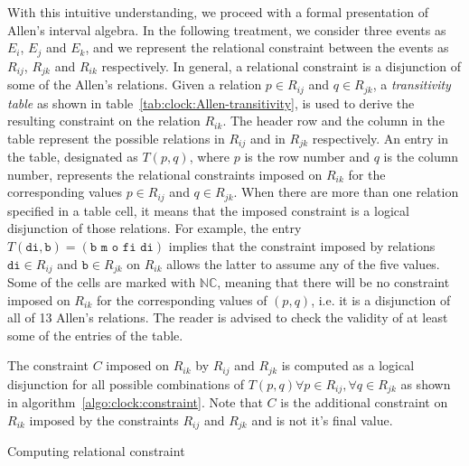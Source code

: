 With this intuitive understanding, we proceed with a formal presentation of Allen's interval algebra. In the following treatment, we 
consider three events as $E_i$, $E_j$ and $E_k$, and we represent the relational constraint between the events as $R_{ij}$, $R_{jk}$ 
and $R_{ik}$ respectively. In general, a relational constraint is a disjunction of some of the Allen's relations. 
%
Given a relation $p \in R_{ij}$ and $q \in R_{jk}$, a {\em transitivity table} as shown in table~\ref{tab:clock:Allen-transitivity}, 
is used to derive the resulting constraint on the relation $R_{ik}$. The header row and the column in the table 
represent the possible relations in $R_{ij}$ and in $R_{jk}$ respectively. An entry in the table, designated as $T(p,q)$, where $p$ 
is the row number and $q$ is the column number, represents the relational constraints imposed on $R_{ik}$ for the corresponding values 
$p \in R_{ij}$ and $q \in R_{jk}$. When there are more than one relation specified in a table cell, it means that the imposed constraint
is a logical disjunction of those relations. For example, the entry $T(\texttt{di},\texttt{b}) = (\texttt{b m o fi di})$ implies that 
the constraint imposed
by relations $\texttt{di} \in R_{ij}$ and $\texttt{b} \in R_{jk}$ on $R_{ik}$ allows the latter to assume any of the five values. Some 
of the cells are marked with $\mathbb{NC}$, meaning that there will be no constraint imposed on $R_{ik}$ for the corresponding values 
of $(p,q)$, i.e. it is a disjunction of all of 13 Allen's relations. The reader is advised to check the validity of at least some of the 
entries of the table.
 
The constraint $C$ imposed on $R_{ik}$ by $R_{ij}$ and $R_{jk}$ is computed as a logical disjunction for all possible combinations of 
$T(p,q) \forall p \in R_{ij}, \forall q \in R_{jk}$ as shown in algorithm~\ref{algo:clock:constraint}. Note that $C$ is the additional 
constraint on $R_{ik}$ imposed by the constraints $R_{ij}$ and $R_{jk}$ and is not it's final value. 

\begin{algorithm}[!htbp]
	\SetAlgoLined
	\DontPrintSemicolon
	\caption{Computing relational constraint}
	\label{algo:clock:constraint}
\end{algorithm}


